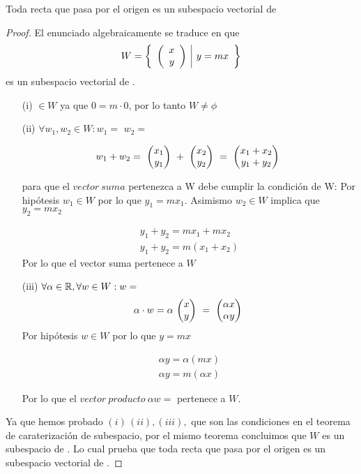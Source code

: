 \begin{theorem}
 Toda recta que pasa por el origen es un subespacio vectorial de \rdos

\end{theorem}
\begin{proof}

El enunciado algebraicamente se traduce en que $$W= \left\{\begin{array}{c|c} {\left( \begin{array}{c} x\\ y \end{array}\right) }&{y=mx} \end{array} \right\}$$
es un subespacio vectorial de \rdos.
\begin{enumerate}


\item[(i)]  $\in W$ ya que $0=m\cdot 0$, por lo tanto $W\neq \phi$ 

\item[(ii)] $\forall w_1, w_2 \in W: w_1=$ 
 $w_2=$

\[
w_1+w_2=\mbox{ \ensuremath{\begin{pmatrix} x_1\\ y_1\\ \end{pmatrix} } }+\mbox{ \ensuremath{\begin{pmatrix} x_2\\ y_2\\ \end{pmatrix} } }=
\mbox{ \ensuremath{\begin{pmatrix} x_1+x_2\\ y_1+y_2\\ \end{pmatrix} } }
\]

para que el $vector\ suma$ pertenezca a W debe cumplir la condici{\'o}n de W:
Por hip{\'o}tesis $w_1 \in W $ por lo que $y_1=mx_1$. Asimismo $w_2 \in W$ implica que
$y_2=mx_2$

\[
\begin{array}{c}

y_1+y_2=mx_1+mx_2
\\
y_1+y_2=m\left(x_1+x_2\right)
\end{array}
\]
Por lo que el vector suma pertenece a $W$

\item[(iii)] $\forall \alpha \in \mbox{\ensuremath{\mathbb{R}}}, \forall w \in W: w=$
\[
\alpha\cdot w=\alpha\mbox{ \ensuremath{\begin{pmatrix} x\\ y\\ \end{pmatrix} } }=
\mbox{ \ensuremath{\begin{pmatrix} \alpha x\\ \alpha y\\ \end{pmatrix} } }
\]
Por hip\'otesis $w\in W$ por lo que $y=mx$

\[\begin{array}{c}
\alpha y=\alpha\left(mx\right)
\\
\alpha y=m\left( \alpha x\right)
\end{array}
\]

Por lo que el $vector\ producto\ \alpha w=$ pertenece a $W$.

\end{enumerate}
Ya que hemos probado $\left( i\right)\, \left(ii\right), \left(iii\right),$ que son las condiciones en el teorema de caraterizaci\'on de subespacio, por el mismo teorema concluimos que $W$ es un subespacio de \rdos. Lo cual prueba que toda recta que pasa por el origen es un subespacio vectorial de \rdos.

\end{proof}


